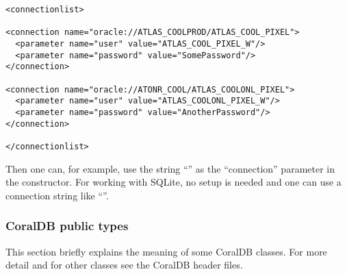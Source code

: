 \begin{verbatim}
<connectionlist>

<connection name="oracle://ATLAS_COOLPROD/ATLAS_COOL_PIXEL">
  <parameter name="user" value="ATLAS_COOL_PIXEL_W"/>
  <parameter name="password" value="SomePassword"/>
</connection>

<connection name="oracle://ATONR_COOL/ATLAS_COOLONL_PIXEL">
  <parameter name="user" value="ATLAS_COOLONL_PIXEL_W"/>
  <parameter name="password" value="AnotherPassword"/>
</connection>

</connectionlist>
\end{verbatim}

Then one can, for example, use the string
``'' as the
``connection'' parameter in the  constructor.
For working with SQLite, no setup is needed and one can use a connection
string like ``''.


\subsubsection{CoralDB public types}

This section briefly explains the meaning of some CoralDB classes.
For more detail and for other classes see the CoralDB header files.

